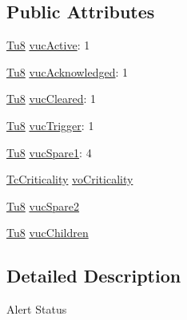 \subsection*{Public Attributes}
\begin{DoxyCompactItemize}
\item 
\mbox{\hyperlink{namespace_g_n_common_a7939e251ddbf5d3a31832dcfdc8bde39}{Tu8}} \mbox{\hyperlink{class_g_n_common_1_1_g_n_notification_1_1_g_tc_status_a4a146c5bd30bf1d2150b896c5edf8bd3}{vuc\+Active}}\+: 1
\item 
\mbox{\hyperlink{namespace_g_n_common_a7939e251ddbf5d3a31832dcfdc8bde39}{Tu8}} \mbox{\hyperlink{class_g_n_common_1_1_g_n_notification_1_1_g_tc_status_a5aaba182799bfc4098f50fd16bf52550}{vuc\+Acknowledged}}\+: 1
\item 
\mbox{\hyperlink{namespace_g_n_common_a7939e251ddbf5d3a31832dcfdc8bde39}{Tu8}} \mbox{\hyperlink{class_g_n_common_1_1_g_n_notification_1_1_g_tc_status_a1aaee7841edfccb69229a59894a5cac0}{vuc\+Cleared}}\+: 1
\item 
\mbox{\hyperlink{namespace_g_n_common_a7939e251ddbf5d3a31832dcfdc8bde39}{Tu8}} \mbox{\hyperlink{class_g_n_common_1_1_g_n_notification_1_1_g_tc_status_a6d02e274c66e3d95f004a2c54026fea1}{vuc\+Trigger}}\+: 1
\item 
\mbox{\hyperlink{namespace_g_n_common_a7939e251ddbf5d3a31832dcfdc8bde39}{Tu8}} \mbox{\hyperlink{class_g_n_common_1_1_g_n_notification_1_1_g_tc_status_a7c3f5f2f301bb9305a7c08792760247d}{vuc\+Spare1}}\+: 4
\item 
\mbox{\hyperlink{namespace_g_n_common_1_1_g_n_notification_ac544f67a385924ba649033c93a8793eb}{Tc\+Criticality}} \mbox{\hyperlink{class_g_n_common_1_1_g_n_notification_1_1_g_tc_status_ae586e45eb3008c2992da2868cd1562ad}{vo\+Criticality}}
\item 
\mbox{\hyperlink{namespace_g_n_common_a7939e251ddbf5d3a31832dcfdc8bde39}{Tu8}} \mbox{\hyperlink{class_g_n_common_1_1_g_n_notification_1_1_g_tc_status_a3464029dd6127d52b8f71d92fbc134a1}{vuc\+Spare2}}
\item 
\mbox{\hyperlink{namespace_g_n_common_a7939e251ddbf5d3a31832dcfdc8bde39}{Tu8}} \mbox{\hyperlink{class_g_n_common_1_1_g_n_notification_1_1_g_tc_status_a61700f44f85d3588efe51fd96daa780d}{vuc\+Children}}
\end{DoxyCompactItemize}


\subsection{Detailed Description}
Alert Status 

